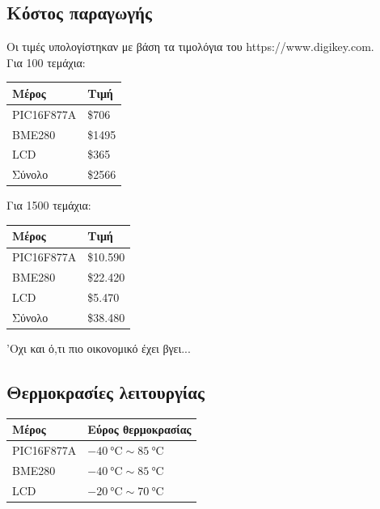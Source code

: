 \documentclass{article}
\begin{document}
\subsection{Κόστος παραγωγής}

Οι τιμές υπολογίστηκαν με βάση τα τιμολόγια του https://www.digikey.com. \\

Για 100 τεμάχια:
\begin{center}
\begin{tabular}{|l|l|}
	\hline
	\textbf{Μέρος} & \textbf{Τιμή} \\ 	
	\hline
	PIC16F877A	& \$706 \\
	BME280		& \$1495 \\
	LCD		& \$365 \\
	\hline
	Σύνολο		& \$2566 \\
	\hline
\end{tabular}
\end{center}

Για 1500 τεμάχια:
\begin{center}
\begin{tabular}{|l|l|}
	\hline
	\textbf{Μέρος} & \textbf{Τιμή} \\ 	
	\hline
	PIC16F877A	& \$10.590 \\
	BME280		& \$22.420 \\
	LCD		& \$5.470 \\
	\hline
	Σύνολο		& \$38.480 \\
	\hline
\end{tabular}
\end{center}

'Οχι και ό,τι πιο οικονομικό έχει βγει...

\subsection{Θερμοκρασίες λειτουργίας}

\begin{center}
\begin{tabular}{|l|l|}
	\hline
	\textbf{Μέρος} & \textbf{Εύρος θερμοκρασίας} \\ 	
	\hline
	PIC16F877A	& $\SI{-40}{\celsius} \sim \SI{85}{\celsius}$ \\
	BME280		& $\SI{-40}{\celsius} \sim \SI{85}{\celsius}$ \\
	LCD		& $\SI{-20}{\celsius} \sim \SI{70}{\celsius}$ \\
	\hline
\end{tabular}
\end{center}
\end{document}
